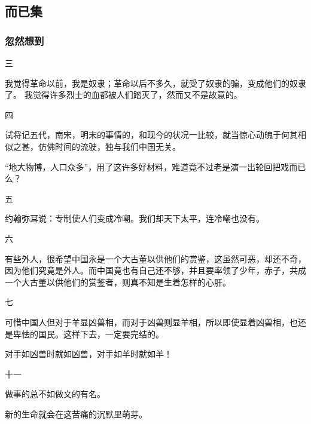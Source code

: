 \documentclass[a4paper]{ctexart}
\begin{document}
\begin{sloppy}
        \part{而已集}
        \section{
            忽然想到
        }
        三

        我觉得革命以前，我是奴隶；革命以后不多久，就受了奴隶的骗，变成他们的奴隶了。
我觉得许多烈士的血都被人们踏灭了，然而又不是故意的。
\vspace{1em}

四

试将记五代，南宋，明末的事情的，和现今的状况一比较，就当惊心动魄于何其相似之甚，仿佛时间的流驶，独与我们中国无关。

“地大物博，人口众多”，用了这许多好材料，难道竟不过老是演一出轮回把戏而已么？
\vspace{1em}

五

约翰弥耳说：专制使人们变成冷嘲。我们却天下太平，连冷嘲也没有。
\vspace{1em}

六

有些外人，很希望中国永是一个大古董以供他们的赏鉴，这虽然可恶，却还不奇，因为他们究竟是外人。而中国竟也有自己还不够，并且要率领了少年，赤子，共成一个大古董以供他们的赏鉴者，则真不知是生着怎样的心肝。
\vspace{1em}

七

可惜中国人但对于羊显凶兽相，而对于凶兽则显羊相，所以即使显着凶兽相，也还是卑怯的国民。这样下去，一定要完结的。

对手如凶兽时就如凶兽，对手如羊时就如羊！
\vspace{1em}

十一

做事的总不如做文的有名。

新的生命就会在这苦痛的沉默里萌芽。


    \end{sloppy}
\end{document}
